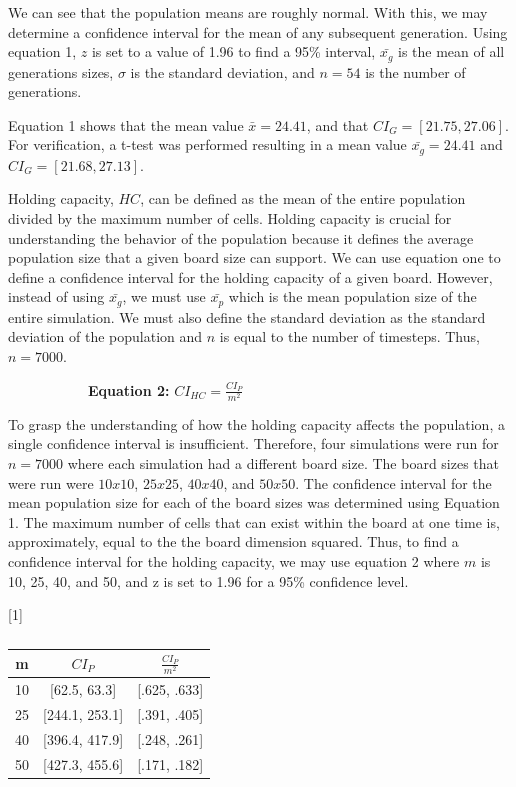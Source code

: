 \documentclass[12pt]{article}
\begin{document}
	We can see that the population means are roughly normal. 
	With this, we may determine a confidence interval for the mean of any subsequent generation.
	Using equation 1, $z$ is set to a value of 1.96 to find a 95\% interval, $\bar{x_g}$ is the mean of all generations sizes, $\sigma$ is the standard deviation, and $n=54$ is the number of generations.

	Equation 1 shows that the mean value $\bar{x} = 24.41$, and that $CI_G = [21.75, 27.06]$. 
	For verification, a t-test was performed resulting in a mean value $\bar{x_g} = 24.41$ and $CI_G = [21.68, 27.13]$.

	Holding capacity, $HC$, can be defined as the mean of the entire population divided by the maximum number of cells. 
	Holding capacity is crucial for understanding the behavior of the population because it defines the average population size that a given board size can support.
	We can use equation one to define a confidence interval for the holding capacity of a given board. 
	However, instead of using $\bar{x_g}$, we must use $\bar{x_p}$ which is the mean population size of the entire simulation. 
	We must also define the standard deviation as the standard deviation of the population and $n$ is equal to the number of timesteps. 
	Thus, $n = 7000$.
	
	\begin{figure}[H]
		\begin{subfigure}[b]{\textwidth}
			\center
			\textbf{Equation 2: } $CI_{HC} = \frac{CI_P}{m^2}$ 
		\end{subfigure}
	\end{figure}

	To grasp the understanding of how the holding capacity affects the population, a single confidence interval is insufficient.
	Therefore, four simulations were run for $n = 7000$ where each simulation had a different board size. 
	The board sizes that were run were $10x10$, $25x25$, $40x40$, and $50x50$. 
	The confidence interval for the mean population size for each of the board sizes was determined using Equation 1.
	The maximum number of cells that can exist within the board at one time is, approximately, equal to the the board dimension squared.
	Thus, to find a confidence interval for the holding capacity, we may use equation 2 where $m$ is 10, 25, 40, and 50, and z is set to 1.96 for a 95\% confidence level.

	\begin{table}[H]
		\caption{}
		\label{fig: Table 1}
		\centering
		\def\arraystretch{1.5}%
		\scalebox{1}[1]{
		\begin{tabular}{|c|c|c|}
		\hline
			m & $CI_P$ & $\frac{CI_P}{m^2}$ \\ \hline
			10 & [62.5, 63.3] & [.625,  .633] \\ \hline
			25 & [244.1,  253.1] & [.391,  .405] \\ \hline
			40 & [396.4,  417.9] & [.248,  .261] \\ \hline
			50 & [427.3,  455.6] & [.171, .182] \\ \hline
		\end{tabular}}
	\end{table}
\end{document}
